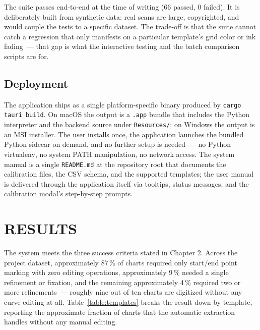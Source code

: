 \documentclass[a4paper,12pt]{report}
\begin{document}
The suite passes end-to-end at the time of writing (66 passed, 0 failed). It is deliberately built from synthetic data: real scans are large, copyrighted, and would couple the tests to a specific dataset. The trade-off is that the suite cannot catch a regression that only manifests on a particular template's grid color or ink fading~--- that gap is what the interactive testing and the batch comparison scripts are for.

\section{Deployment}

The application ships as a single platform-specific binary produced by \texttt{cargo tauri build}. On macOS the output is a \texttt{.app} bundle that includes the Python interpreter and the backend source under \texttt{Resources/}; on Windows the output is an MSI installer. The user installs once, the application launches the bundled Python sidecar on demand, and no further setup is needed~--- no Python virtualenv, no system PATH manipulation, no network access. The system manual is a single \texttt{README.md} at the repository root that documents the calibration files, the CSV schema, and the supported templates; the user manual is delivered through the application itself via tooltips, status messages, and the calibration modal's step-by-step prompts.

\chapter{RESULTS}

The system meets the three success criteria stated in Chapter 2. Across the project dataset, approximately 87\,\% of charts required only start/end point marking with zero editing operations, approximately 9\,\% needed a single refinement or fixation, and the remaining approximately 4\,\% required two or more refinements~--- roughly nine out of ten charts are digitized without any curve editing at all. Table~\ref{table:templates} breaks the result down by template, reporting the approximate fraction of charts that the automatic extraction handles without any manual editing.
\end{document}
